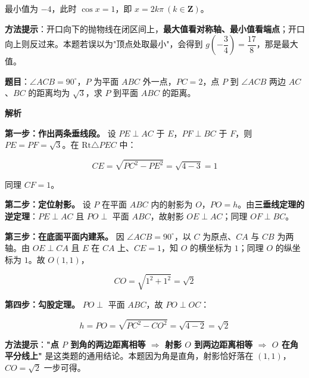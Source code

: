 最小值为 $-4$，此时 $\cos x=1$，即 $x=2k\pi\ (k\in\mathbf Z)$。


\begin{gktip}
\textbf{方法提示}：开口向下的抛物线在闭区间上，\textbf{最大值看对称轴、最小值看端点}；开口向上则反过来。本题若误以为"顶点处取最小"，会得到 $g\left(-\dfrac34\right)=\dfrac{17}8$，那是最大值。
\end{gktip}

\par\medskip


\textbf{题目}：$\angle ACB=90^\circ$，$P$ 为平面 $ABC$ 外一点，$PC=2$，点 $P$ 到 $\angle ACB$ 两边 $AC$、$BC$ 的距离均为 $\sqrt3$，求 $P$ 到平面 $ABC$ 的距离。

\textbf{解析}

\textbf{第一步：作出两条垂线段。} 设 $PE\perp AC$ 于 $E$，$PF\perp BC$ 于 $F$，则 $PE=PF=\sqrt3$。在 $\mathrm{Rt}\triangle PEC$ 中：

\[CE=\sqrt{PC^{2}-PE^{2}}=\sqrt{4-3}=1\]

同理 $CF=1$。

\textbf{第二步：定位射影。} 设 $P$ 在平面 $ABC$ 内的射影为 $O$，$PO=h$。由\textbf{三垂线定理的逆定理}：$PE\perp AC$ 且 $PO\perp$ 平面 $ABC$，故射影 $OE\perp AC$；同理 $OF\perp BC$。

\textbf{第三步：在底面平面内建系。} 因 $\angle ACB=90^\circ$，以 $C$ 为原点、$CA$ 与 $CB$ 为两轴。由 $OE\perp CA$ 且 $E$ 在 $CA$ 上、$CE=1$，知 $O$ 的横坐标为 $1$；同理 $O$ 的纵坐标为 $1$。故 $O(1,1)$，

\[CO=\sqrt{1^{2}+1^{2}}=\sqrt2\]

\textbf{第四步：勾股定理。} $PO\perp$ 平面 $ABC$，故 $PO\perp OC$：

\[h=PO=\sqrt{PC^{2}-CO^{2}}=\sqrt{4-2}=\sqrt2\]


\begin{gktip}
\textbf{方法提示}：\textbf{"点 $P$ 到角的两边距离相等 $\Rightarrow$ 射影 $O$ 到两边距离相等 $\Rightarrow$ $O$ 在角平分线上"} 是这类题的通用结论。本题因为角是直角，射影恰好落在 $(1,1)$，$CO=\sqrt2$ 一步可得。
\end{gktip}

\par\medskip



